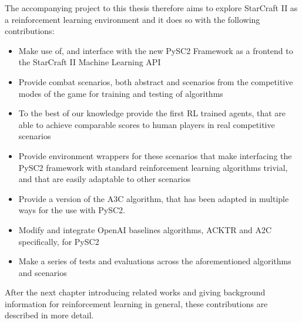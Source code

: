 The accompanying project to this thesis therefore aims to explore StarCraft II as a reinforcement learning environment and it does so with the following contributions:
\begin{itemize}
\item Make use of, and interface with the new PySC2 Framework as a frontend to the StarCraft II Machine Learning API 
\item Provide combat scenarios, both abstract and scenarios from the competitive modes of the game for training and testing of algorithms
\item To the best of our knowledge provide the first RL trained agents, that are able to achieve comparable scores to human players in real competitive scenarios
\item Provide environment wrappers for these scenarios that make interfacing the PySC2 framework with standard reinforcement learning algorithms trivial, and that are easily adaptable to other scenarios
\item Provide a version of the A3C algorithm, that has been adapted in multiple ways for the use with PySC2.
\item Modify and integrate OpenAI baselines algorithms, ACKTR and A2C specifically, for PySC2
\item Make a series of tests and evaluations across the aforementioned algorithms and scenarios
\end{itemize}

After the next chapter introducing related works and giving background information for reinforcement learning in general, these contributions are described in more detail.
